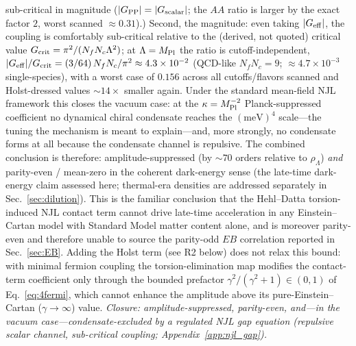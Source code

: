 \documentclass[aps,prd,twocolumn,superscriptaddress,showpacs,preprintnumbers,nofootinbib,longbibliography,floatfix]{revtex4-2}
\begin{document}
sub-critical in magnitude ($|G_{\rm PP}|=|G_{\rm scalar}|$; the $AA$ ratio is
larger by the exact factor $2$, worst scanned $\approx0.31$).) Second,
the magnitude: even taking $|G_{\rm eff}|$, the coupling is comfortably
sub-critical
relative to the (derived, not quoted) critical value
$G_{\rm crit}=\pi^2/(N_f N_c\Lambda^2)$; at $\Lambda=M_{\rm Pl}$ the ratio is
cutoff-independent, $|G_{\rm eff}|/G_{\rm crit}=(3/64)\,N_f N_c/\pi^2
\approx 4.3\times10^{-2}$ (QCD-like $N_f N_c=9$; $\approx 4.7\times10^{-3}$
single-species), with a worst case of $0.156$ across all cutoffs/flavors
scanned and Holst-dressed values ${\sim}14\times$ smaller again. Under the
standard mean-field NJL framework this closes the vacuum case: at the
$\kappa=M_{\rm Pl}^{-2}$ Planck-suppressed coefficient no dynamical chiral
condensate reaches the $(\text{meV})^4$ scale---the tuning the mechanism is
meant to explain---and, more strongly, no condensate forms at all because the
condensate channel is repulsive.
The combined conclusion is therefore: amplitude-suppressed (by ${\sim}70$
orders relative to $\rho_\Lambda$) \emph{and} parity-even / mean-zero in
the coherent dark-energy sense
(the late-time dark-energy claim assessed here;
thermal-era densities are addressed separately in Sec.~\ref{sec:dilution}).
This is the familiar conclusion that the Hehl--Datta torsion-induced
NJL contact term cannot drive late-time acceleration in any
Einstein--Cartan model with Standard Model matter content alone, and is
moreover parity-even and therefore unable to source the parity-odd
$E\!B$ correlation reported in Sec.~\ref{sec:EB}. Adding the Holst term
(see R2 below) does not relax this bound: with minimal fermion coupling
the torsion-elimination map modifies the contact-term coefficient only
through the bounded prefactor $\gamma^2/(\gamma^2+1)\in(0,1)$ of
Eq.~\eqref{eq:4fermi}, which cannot enhance the amplitude above its
pure-Einstein--Cartan ($\gamma\to\infty$) value.
\emph{Closure: amplitude-suppressed, parity-even, and---in the vacuum
case---condensate-excluded by a regulated NJL gap equation
(repulsive scalar channel, sub-critical coupling; Appendix~\ref{app:njl_gap}).}
\end{document}
